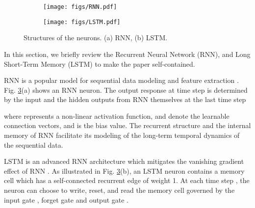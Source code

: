 \documentclass[letterpaper]{article}
\begin{document}
\begin{figure}[t]
	\centering
	\begin{subfigure}[t]{0.25\linewidth}
		\centering\texttt{[image: figs/RNN.pdf]}
		\caption{}
		\label{subfig:RNN}
	\end{subfigure}	
	\begin{subfigure}[t]{0.65\linewidth}
		\centering\texttt{[image: figs/LSTM.pdf]}
		\caption{}			
		\label{subfig:LSTM_unit}
	\end{subfigure}
	\vspace{-3mm}
	\caption[]{Structures of the neurons. (a) RNN,
		(b) LSTM.}\label{fig:RNNLSTM}
	\vspace{1.5mm}
\end{figure}
In this section, we briefly review the Recurrent Neural Network (RNN), and Long Short-Term Memory (LSTM) to make the paper self-contained.

RNN is a popular model for sequential data modeling and feature extraction \cite{Graves2012}. Fig. \ref{fig:RNNLSTM}(a) shows an RNN neuron. The output response  at time step  is determined by the input  and the hidden outputs from RNN themselves at the last time step 

\begin{comment}

\end{comment}
where  represents a non-linear activation function,  and  denote the learnable connection vectors, and  is the bias value. The recurrent structure and the internal memory of RNN facilitate its modeling of the long-term temporal dynamics of the sequential data.


LSTM is an advanced RNN architecture which mitigates the vanishing gradient effect of RNN \cite{LSTM1997,vanish2001,Graves2012}. As illustrated in Fig. \ref{fig:RNNLSTM}(b), an LSTM neuron contains a memory cell  which has a self-connected recurrent edge of weight 1. At each time step , the neuron can choose to write, reset, and read the memory cell governed by the input gate , forget gate  and output gate .
\begin{comment}
Their activations of LSTM neurons can be summarized as follows:

where  is the element-wise product,  is the sigmoid activation function,  denotes the weighting matrix between  and  , , .
\end{comment}
\end{document}
